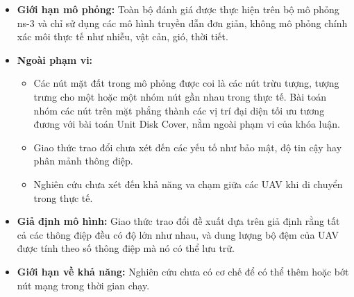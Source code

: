 \documentclass[a4paper]{article}
\begin{document}
\begin{itemize}
  \item {\bfseries Giới hạn mô phỏng:} Toàn bộ đánh giá được thực hiện trên bộ mô phỏng ns-3 và chỉ sử dụng các mô hình truyền dẫn đơn giản, không mô phỏng chính xác môi thực tế như nhiễu, vật cản, gió, thời tiết.
  \item {\bfseries Ngoài phạm vi:} 
  \begin{itemize}
    \item Các nút mặt đất trong mô phỏng được coi là các nút trừu tượng, tượng trưng cho một hoặc một nhóm nút gần nhau trong thực tế. Bài toán nhóm các nút trên mặt phẳng thành các vị trí đại diện tối ưu tương đương với bài toán Unit Disk Cover, nằm ngoài phạm vi của khóa luận. 
    \item Giao thức trao đổi chưa xét đến các yếu tố như bảo mật, độ tin cậy hay phân mảnh thông điệp.
    \item Nghiên cứu chưa xét đến khả năng va chạm giữa các UAV khi di chuyển trong thực tế.
  \end{itemize}
  \item {\bfseries Giả định mô hình:} Giao thức trao đổi đề xuất dựa trên giả định rằng tất cả các thông điệp đều có độ lớn như nhau, và dung lượng bộ đệm của UAV được tính theo số thông điệp mà nó có thể lưu trữ.
  \item {\bfseries Giới hạn về khả năng:} Nghiên cứu chưa có cơ chế để có thể thêm hoặc bớt nút mạng trong thời gian chạy.
\end{itemize}
\end{document}
